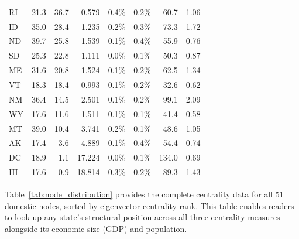 \documentclass[12pt,oneside]{book}
\begin{document}
\begin{footnotesize}
\begin{singlespace}
\begin{longtable}{l r r r r r r r}
RI & 21.3 & 36.7 & 0.579 & 0.4\% & 0.2\% & 60.7 & 1.06 \\
ID & 35.0 & 28.4 & 1.235 & 0.2\% & 0.3\% & 73.3 & 1.72 \\
ND & 39.7 & 25.8 & 1.539 & 0.1\% & 0.4\% & 55.9 & 0.76 \\
SD & 25.3 & 22.8 & 1.111 & 0.0\% & 0.1\% & 50.3 & 0.87 \\
ME & 31.6 & 20.8 & 1.524 & 0.1\% & 0.2\% & 62.5 & 1.34 \\
VT & 18.3 & 18.4 & 0.993 & 0.1\% & 0.2\% & 32.6 & 0.62 \\
NM & 36.4 & 14.5 & 2.501 & 0.1\% & 0.2\% & 99.1 & 2.09 \\
WY & 17.6 & 11.6 & 1.511 & 0.1\% & 0.1\% & 41.4 & 0.58 \\
MT & 39.0 & 10.4 & 3.741 & 0.2\% & 0.1\% & 48.6 & 1.05 \\
AK & 17.4 & 3.6 & 4.889 & 0.1\% & 0.4\% & 54.4 & 0.74 \\
DC & 18.9 & 1.1 & 17.224 & 0.0\% & 0.1\% & 134.0 & 0.69 \\
HI & 17.6 & 0.9 & 18.814 & 0.3\% & 0.2\% & 89.3 & 1.43 \\
\end{longtable}
\end{singlespace}
\end{footnotesize}

Table~\ref{tab:node_distribution} provides the complete centrality data for all 51 domestic nodes, sorted by eigenvector centrality rank. This table enables readers to look up any state's structural position across all three centrality measures alongside its economic size (GDP) and population.
\end{document}
